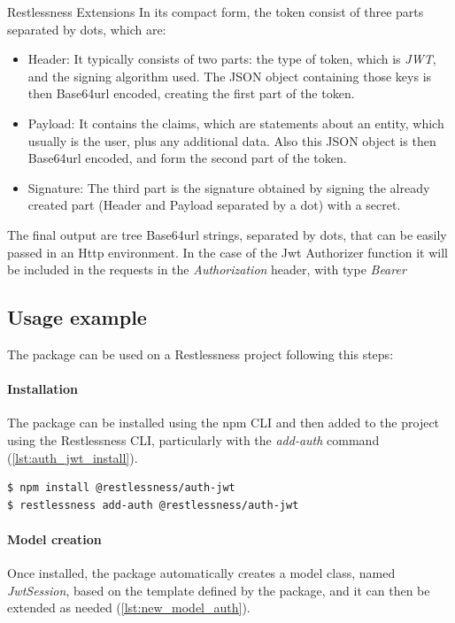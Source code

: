 \begin{chapter}{Restlessness Extensions}
    In its compact form, the token consist of three parts separated by dots,
    which are:
    \begin{itemize}
        \item Header: It typically consists of two parts: the type of token, which
            is \textit{JWT}, and the signing algorithm used. The JSON object
            containing those keys is then Base64url encoded, creating the first
            part of the token.
        \item Payload: It contains the claims, which are statements about an entity,
            which usually is the user, plus any additional data. Also this JSON
            object is then Base64url encoded, and form the second part of the token.
        \item Signature: The third part is the signature obtained by signing the
            already created part (Header and Payload separated by a dot) with a
            secret.
    \end{itemize}
    The final output are tree Base64url strings, separated by dots, that can be
    easily passed in an Http environment. In the case of the Jwt Authorizer function
    it will be included in the requests in the \textit{Authorization} header,
    with type \textit{Bearer}

    \subsection{Usage example}
    The package can be used on a Restlessness project following this steps:

    \paragraph{Installation}
    The package can be installed using the npm CLI and then added to the project
    using the Restlessness CLI, particularly with the \textit{add-auth} command
    (\ref{lst:auth_jwt_install}).

    \bigskip
    \begin{lstlisting}[caption=auth-jwt installation, label={lst:auth_jwt_install}]
$ npm install @restlessness/auth-jwt
$ restlessness add-auth @restlessness/auth-jwt
    \end{lstlisting}

    \paragraph{Model creation}
    Once installed, the package automatically creates a model class, named
    \textit{JwtSession}, based on the template defined by the package, and it can
    then be extended as needed (\ref{lst:new_model_auth}).


\end{chapter}

